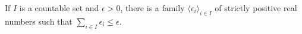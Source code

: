  If $I$ is a countable set and
$\epsilon>0$, there is a family
$\langle\epsilon_i\rangle_{i\in I}$ of strictly positive real numbers
such that $\sum_{i\in I}\epsilon_i\le\epsilon$.  

\exercises{


}%



\discrpage

